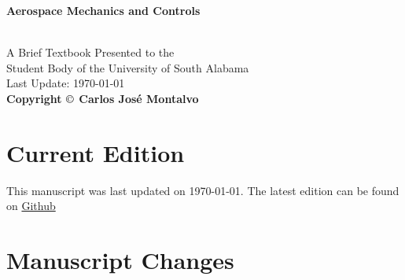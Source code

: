 \documentclass{article}
\begin{document}
\begin{center}
\begin{LARGE}{\bf Aerospace Mechanics and Controls}\end{LARGE}\\
\large
\vspace{22 mm}
   A Brief Textbook Presented to the \\ 
   Student Body of the University of South Alabama \\
\vspace{22 mm}
\vspace{22 mm}
\vspace{22 mm}
Last Update: \today\\
{\bf Copyright $\copyright$ Carlos Jos\'{e} Montalvo}
\end{center}

\linespread{1}

\newpage


\section*{}

\section*{Current Edition}

This manuscript was last updated on \today. 
The latest edition can be found on \href{https://github.com/cmontalvo251/LaTeX/blob/master/Aerospace_Mechanics/aerospace_mechanics.pdf}{Github}

\section*{Manuscript Changes}
\end{document}
